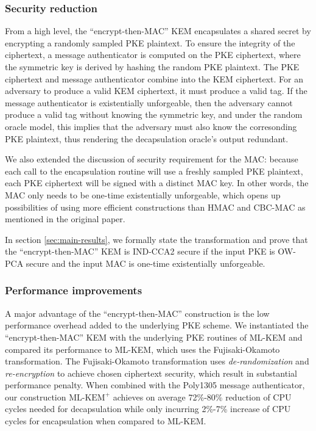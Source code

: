 \documentclass[journal=tches,submission]{iacrtrans}
\begin{document}
\subsubsection{Security reduction}
From a high level, the ``encrypt-then-MAC'' KEM encapsulates a shared secret by encrypting a randomly sampled PKE plaintext. To ensure the integrity of the ciphertext, a message authenticator is computed on the PKE ciphertext, where the symmetric key is derived by hashing the random PKE plaintext. The PKE ciphertext and message authenticator combine into the KEM ciphertext. For an adversary to produce a valid KEM ciphertext, it must produce a valid tag. If the message authenticator is existentially unforgeable, then the adversary cannot produce a valid tag without knowing the symmetric key, and under the random oracle model, this implies that the adversary must also know the corresonding PKE plaintext, thus rendering the decapsulation oracle's output redundant. 

We also extended the discussion of security requirement for the MAC: because each call to the encapsulation routine will use a freshly sampled PKE plaintext, each PKE ciphertext will be signed with a distinct MAC key. In other words, the MAC only needs to be one-time existentially unforgeable, which opens up possibilities of using more efficient constructions than HMAC and CBC-MAC as mentioned in the original paper.

In section \ref{sec:main-results}, we formally state the transformation and prove that the ``encrypt-then-MAC'' KEM is IND-CCA2 secure if the input PKE is OW-PCA secure and the input MAC is one-time existentially unforgeable.

\subsubsection{Performance improvements}
A major advantage of the ``encrypt-then-MAC'' construction is the low performance overhead added to the underlying PKE scheme. We instantiated the ``encrypt-then-MAC'' KEM with the underlying PKE routines of ML-KEM and compared its performance to ML-KEM, which uses the Fujisaki-Okamoto transformation. The Fujisaki-Okamoto transformation uses \emph{de-randomization} and \emph{re-encryption} to achieve chosen ciphertext security, which result in substantial performance penalty. When combined with the Poly1305 message authenticator, our construction $\text{ML-KEM}^+$ achieves on average 72\%-80\% reduction of CPU cycles needed for decapsulation while only incurring 2\%-7\% increase of CPU cycles for encapsulation when compared to ML-KEM.
\end{document}
